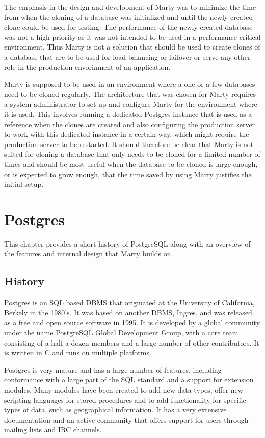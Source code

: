 \documentclass[a4paper,12pt,twoside,BCOR=10mm]{scrbook}
\begin{document}
The emphasis in the design and development of Marty was to minimize the time from when the cloning of a database was initialized and until the newly created clone could be used for testing. The performance of the newly created database was not a high priority as it was not intended to be used in a performance critical environment. Thus Marty is not a solution that should be used to create clones of a database that are to be used for load balancing or failover or serve any other role in the production envorinment of an application.

Marty is supposed to be used in an environment where a one or a few databases need to be cloned regularly. The architecture that was chosen for Marty requires a system administrator to set up and configure Marty for the environment where it is used. This involves running a dedicated Postgres instance that is used as a reference when the clones are created and also configuring the production server to work with this dedicated instance in a certain way, which might require the production server to be restarted. It should therefore be clear that Marty is not suited for cloning a database that only needs to be cloned for a limited number of times and should be most useful when the database to be cloned is large enough, or is expected to grow enough, that the time saved by using Marty justifies the initial setup.

\chapter{Postgres}
This chapter provides a short history of PostgreSQL along with an overview of the features and internal design that Marty builds on.

\section{History}
Postgres is an SQL based DBMS that originated at the University of California, Berkely in the 1980's. It was based on another DBMS, Ingres, and was released as a free and open source software in 1995. It is developed by a global community under the name PostgreSQL Global Development Group, with a core team consisting of a half a dozen members and a large number of other contributors. It is written in C and runs on multiple platforms.

Postgres is very mature and has a large number of features, including conformance with a large part of the SQL standard and a support for extension modules. Many modules have been created to add new data types, offer new scripting languages for stored procedures and to add functionality for specific types of data, such as geographical information. It has a very extensive documentation and an active community that offers support for users through mailing lists and IRC channels.
\end{document}
